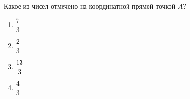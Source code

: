 \begin{ex}
	Какое из чисел отмечено на координатной прямой точкой $A$?
	
	\selectanswer
	\begin{multicols}{4}
		\begin{enumerate}[label=\arabic*)]
			\item $\dfrac{7}{3}$
			\item $\dfrac{2}{3}$
			\item $\dfrac{13}{3}$
			\item $\dfrac{4}{3}$
		\end{enumerate}
	\end{multicols}
\end{ex}
